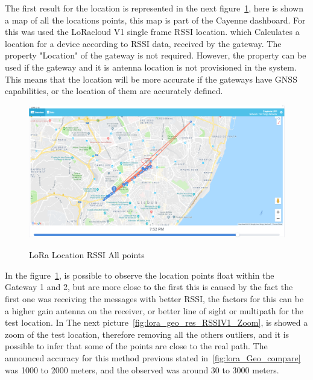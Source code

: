   
The first result for the location is represented in the next figure~\ref{fig:lora_geo_res_rssiv1}, here is shown a map of all the locations points, this map is part of the Cayenne dashboard. For this was used the LoRacloud V1 single frame RSSI location.  which Calculates a location for a device according to RSSI data, received by the gateway. The property "Location" of the gateway is not required. However, the property can be used if the gateway and it is antenna location is not provisioned in the system. This means that the location will be more accurate if the gateways have GNSS capabilities, or the location of them are accurately defined.

\begin{figure}[htbp]
  \centering
  
    {\includegraphics[width=0.8\linewidth]{Chapters/Figures/lorageores21-2.PNG}}%
 
  \caption{LoRa Location RSSI All points}
  \label{fig:lora_geo_res_rssiv1}
\end{figure}

In the figure~\ref{fig:lora_geo_res_rssiv1}, is possible to observe the location points float within the Gateway 1 and 2, but are more close to the first this is caused by the fact the first one was receiving the messages with better RSSI, the factors for this can be a higher gain antenna on the receiver, or better line of sight or multipath for the test location. In The next picture~\ref{fig:lora_geo_res_RSSIV1_Zoom}, is showed a zoom of the test location, therefore removing all the others outliers, and it is possible to infer that some of the points are close to the real path. The announced accuracy for this method previous stated in~\ref{fig:lora_Geo_compare} was 1000 to 2000 meters, and the observed was around 30 to 3000 meters.

